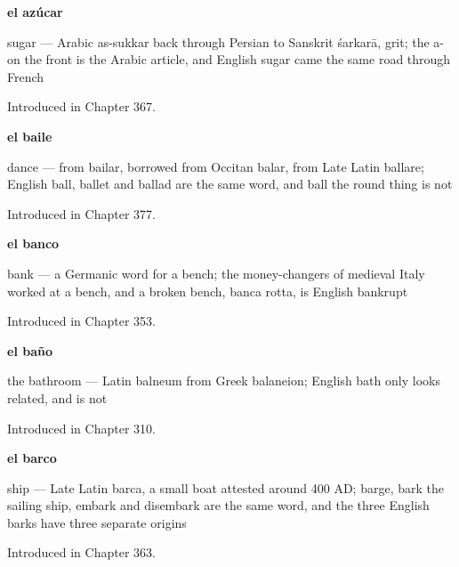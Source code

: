 \noindent\begin{minipage}[t]{\linewidth}
\raggedright
\textbf{el azúcar}\par
\small sugar — Arabic as-sukkar back through Persian to Sanskrit śarkarā, grit; the a- on the front is the Arabic article, and English sugar came the same road through French\par
\footnotesize Introduced in Chapter 367.
\end{minipage}\par\medskip

\noindent\begin{minipage}[t]{\linewidth}
\raggedright
\textbf{el baile}\par
\small dance — from bailar, borrowed from Occitan balar, from Late Latin ballare; English ball, ballet and ballad are the same word, and ball the round thing is not\par
\footnotesize Introduced in Chapter 377.
\end{minipage}\par\medskip

\noindent\begin{minipage}[t]{\linewidth}
\raggedright
\textbf{el banco}\par
\small bank — a Germanic word for a bench; the money-changers of medieval Italy worked at a bench, and a broken bench, banca rotta, is English bankrupt\par
\footnotesize Introduced in Chapter 353.
\end{minipage}\par\medskip

\noindent\begin{minipage}[t]{\linewidth}
\raggedright
\textbf{el baño}\par
\small the bathroom — Latin balneum from Greek balaneion; English bath only looks related, and is not\par
\footnotesize Introduced in Chapter 310.
\end{minipage}\par\medskip

\noindent\begin{minipage}[t]{\linewidth}
\raggedright
\textbf{el barco}\par
\small ship — Late Latin barca, a small boat attested around 400 AD; barge, bark the sailing ship, embark and disembark are the same word, and the three English barks have three separate origins\par
\footnotesize Introduced in Chapter 363.
\end{minipage}\par\medskip

